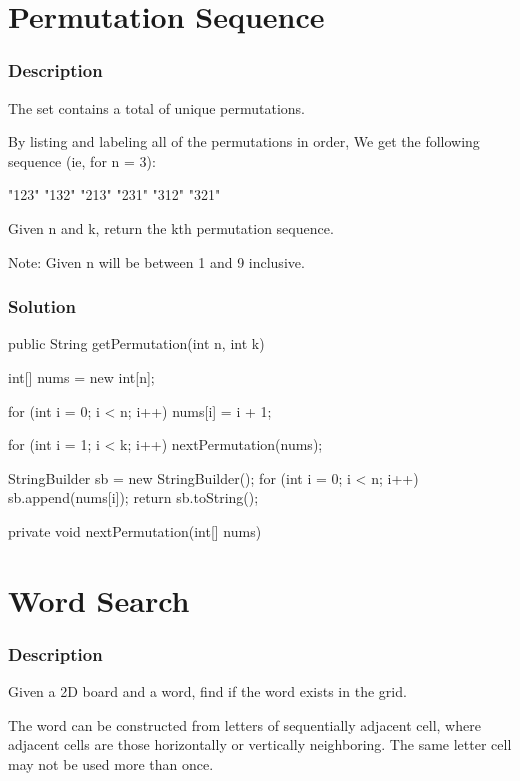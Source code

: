 \section{Permutation Sequence} %

\subsubsection{Description}
The set \code{[1,2,3,…,n]} contains a total of  unique permutations.

By listing and labeling all of the permutations in order,
We get the following sequence (ie, for n = 3):
\begin{Code}
"123"
"132"
"213"
"231"
"312"
"321"
\end{Code}

Given n and k, return the kth permutation sequence.

Note: Given n will be between 1 and 9 inclusive.

\subsubsection{Solution}

\begin{Code}
public String getPermutation(int n, int k) {
    int[] nums = new int[n];

    for (int i = 0; i < n; i++) {
        nums[i] = i + 1;
    }

    for (int i = 1; i < k; i++) {
        nextPermutation(nums);
    }

    StringBuilder sb = new StringBuilder();
    for (int i = 0; i < n; i++) {
        sb.append(nums[i]);
    }
    return sb.toString();
}

private void nextPermutation(int[] nums) {

}
\end{Code}

\newpage


\section{Word Search} %

\subsubsection{Description}
Given a 2D board and a word, find if the word exists in the grid.

The word can be constructed from letters of sequentially adjacent cell, where adjacent cells are those horizontally or vertically neighboring. The same letter cell may not be used more than once.


